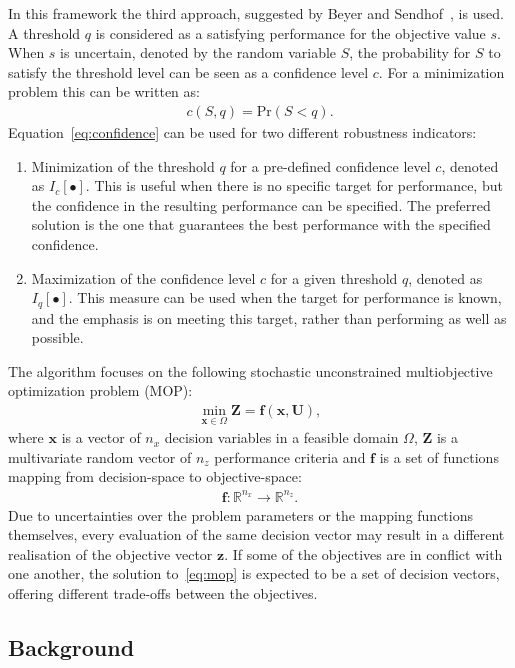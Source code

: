 \documentclass[10pt]{llncs}
\newcommand{\brr}[1]{{\left({#1}\right)}} %
\newcommand{\Iq}[1]{I_q\!\left[{#1}\right]} %
\newcommand{\Ic}[1]{I_c\!\left[{#1}\right]} %
\newcommand{\vx}{\mathbf{x}} %
\newcommand{\vf}{\mathbf{f}} %
\newcommand{\vz}{\mathbf{z}} %
\newcommand{\vZ}{\mathbf{Z}} %
\newcommand{\vU}{\mathbf{U}} %
\begin{document}
In this framework the third approach, suggested by Beyer and Sendhof~\cite{Beyer2007}, is used.
A threshold $q$ is considered as a satisfying performance for the objective value $s$.
When $s$ is uncertain, denoted by the random variable $S$, the probability for $S$ to satisfy the threshold level can be seen as a confidence level $c$.
For a minimization problem this can be written as:
\begin{align}
\label{eq:confidence}
	c\brr{S,q}=\text{Pr}\brr{S<q}.
\end{align}
Equation~\eqref{eq:confidence} can be used for two different robustness indicators:
\begin{enumerate}
	\item Minimization of the threshold $q$ for a pre-defined confidence level $c$, denoted as $\Ic{\bullet}$.
		This is useful when there is no specific target for performance, but the confidence in the resulting performance can be specified.
		The preferred solution is the one that guarantees the best performance with the specified confidence.
	\item Maximization of the confidence level $c$ for a given threshold $q$, denoted as $\Iq{\bullet}$.
		This measure can be used when the target for performance is known, and the emphasis is on meeting this target, rather than performing as well as possible.
\end{enumerate}


The algorithm focuses on the following stochastic unconstrained multiobjective optimization problem (MOP):
\begin{align}
\label{eq:mop}
	\min_{\vx\in\Omega} \vZ=\vf\brr{\vx, \vU},
\end{align}
where $\vx$ is a vector of $n_x$ decision variables in a feasible domain $\Omega$, $\vZ$ is a multivariate random vector of $n_z$ performance criteria and $\vf$ is a set of functions mapping from decision-space to objective-space:
\begin{align}
	\vf: \mathbb{R}^{n_x} \rightarrow \mathbb{R}^{n_z}.
\end{align}
Due to uncertainties over the problem parameters or the mapping functions themselves, every evaluation of the same decision vector may result in a different realisation of the objective vector $\vz$.
If some of the objectives are in conflict with one another, the solution to~\eqref{eq:mop} is expected to be a set of decision vectors, offering different trade-offs between the objectives.

\subsection{\label{sec:intro}Background}
\end{document}
